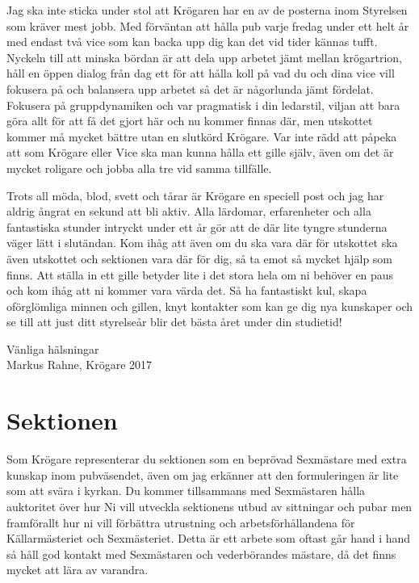 \documentclass[10pt]{article}
\begin{document}
Jag ska inte sticka under stol att Krögaren har en av de posterna inom Styrelsen som kräver mest jobb. Med förväntan att hålla pub varje fredag under ett helt år med endast två vice som kan backa upp dig kan det vid tider kännas tufft. Nyckeln till att minska bördan är att dela upp arbetet jämt mellan krögartrion, håll en öppen dialog från dag ett för att hålla koll på vad du och dina vice vill fokusera på och balansera upp arbetet så det är någorlunda jämt fördelat. Fokusera på gruppdynamiken och var pragmatisk i din ledarstil, viljan att bara göra allt för att få det gjort här och nu kommer finnas där, men utskottet kommer må mycket bättre utan en slutkörd Krögare. Var inte rädd att påpeka att som Krögare eller Vice ska man kunna hålla ett gille själv, även om det är mycket roligare och jobba alla tre vid samma tillfälle.

Trots all möda, blod, svett och tårar är Krögare en speciell post och jag har aldrig ångrat en sekund att bli aktiv. Alla lärdomar, erfarenheter och alla fantastiska stunder intryckt under ett år gör att de där lite tyngre stunderna väger lätt i slutändan. Kom ihåg att även om du ska vara där för utskottet ska även utskottet och sektionen vara där för dig, så ta emot så mycket hjälp som finns. Att ställa in ett gille betyder lite i det stora hela om ni behöver en paus och kom ihåg att ni kommer vara värda det. Så ha fantastiskt kul, skapa oförglömliga minnen och gillen, knyt kontakter som kan ge dig nya kunskaper och se till att just ditt styrelseår blir det bästa året under din studietid!

\begin{itshape}
Vänliga hälsningar\\
Markus Rahne, Krögare 2017\\
\end{itshape}

\newpage

\tableofcontents
\newpage

\section{Sektionen}
Som Krögare representerar du sektionen som en beprövad Sexmästare med extra kunskap inom pubväsendet, även om jag erkänner att den formuleringen är lite som att svära i kyrkan. Du kommer tillsammans med Sexmästaren hålla auktoritet över hur Ni vill utveckla sektionens utbud av sittningar och pubar men framförallt hur ni vill förbättra utrustning och arbetsförhållandena för Källarmästeriet och Sexmästeriet. Detta är ett arbete som oftast går hand i hand så håll god kontakt med Sexmästaren och vederbörandes mästare, då det finns mycket att lära av varandra.
\end{document}
